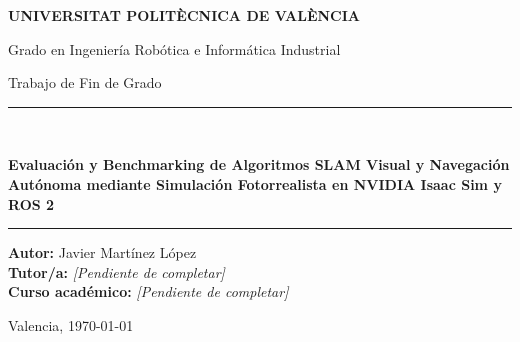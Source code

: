 \documentclass[11pt, a4paper, oneside]{report}
\begin{document}
\begin{titlepage}
  \centering
  \vspace*{1.5cm}

  {\Large\textbf{UNIVERSITAT POLITÈCNICA DE VALÈNCIA}\par}
  \vspace{0.3cm}
  {\large Grado en Ingeniería Robótica e Informática Industrial\par}
  \vspace{0.4cm}
  {\normalsize Trabajo de Fin de Grado\par}

  \vspace{2.2cm}
  \rule{\textwidth}{0.8pt}\\[0.5cm]
  {\LARGE\bfseries Evaluación y Benchmarking de Algoritmos SLAM Visual y Navegación Autónoma mediante Simulación Fotorrealista en NVIDIA Isaac Sim y ROS 2\par}
  \vspace{0.2cm}
  \rule{\textwidth}{0.8pt}

  \vspace{2.2cm}
  \begin{flushleft}
    \large
    \textbf{Autor:} Javier Martínez López\\
    \textbf{Tutor/a:} \textit{[Pendiente de completar]}\\
    \textbf{Curso académico:} \textit{[Pendiente de completar]}
  \end{flushleft}

  \vfill
  \vspace{0.5cm}
  {\normalsize Valencia, \today\par}
\end{titlepage}



\end{document}
